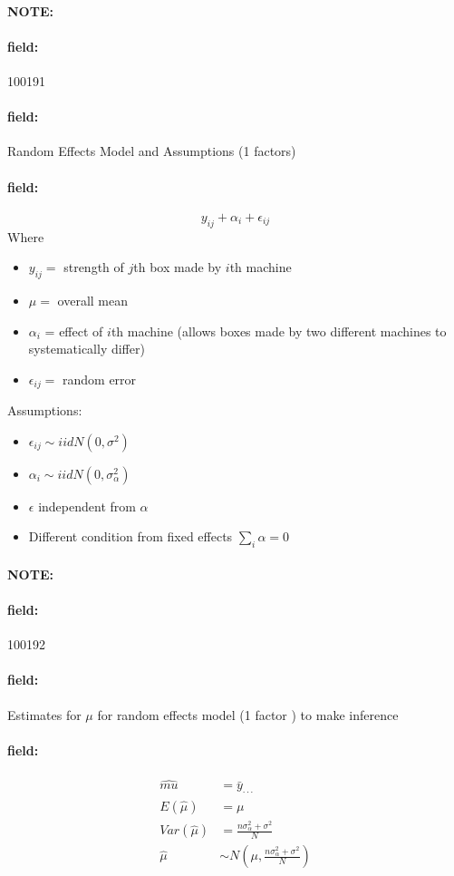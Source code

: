 \documentclass[12pt]{article}
\newenvironment{note}{\paragraph{NOTE:}}{}
\newenvironment{field}{\paragraph{field:}}{}
\begin{document}
\begin{note}
    \begin{field}
        \tiny 100191
    \end{field}
    \begin{field}
        Random Effects Model and Assumptions (1 factors)
    \end{field}
    \begin{field}
        $$y_{ij} + \alpha_i + \epsilon_{ij} $$
        Where
        \begin{itemize}
          \item $y_{ij} = $ strength of $j$th box made by $i$th machine
          \item $\mu = $ overall mean
          \item $\alpha_i$ = effect of $i$th machine (allows boxes made by two different machines to systematically differ)
          \item $\epsilon_{ij} = $ random error
        \end{itemize}

        Assumptions:
        \begin{itemize}
          \item $\epsilon_{ij} \sim iid N(0,\sigma^2)$
          \item $\alpha_i \sim iid N(0,\sigma_\alpha^2)$
          \item $\epsilon $ independent from $\alpha $
          \item Different condition from fixed effects $\sum_i \alpha = 0$
        \end{itemize}
    \end{field}
\end{note}

\begin{note}
    \begin{field}
        \tiny 100192
    \end{field}
    \begin{field}
        Estimates for $\mu$ for random effects model (1 factor ) to make inference
    \end{field}
    \begin{field}
        \begin{align*}
          \hat{mu} &= \bar{y}_{\cdot\cdot\cdot} \\
          E(\hat{\mu}) &= \mu \\
          Var(\hat{\mu}) &= \frac{n \sigma_\alpha^2 + \sigma^2}{N}\\
          \hat{\mu} &\sim N(\mu, \frac{n \sigma_\alpha^2 + \sigma^2}{N})
        \end{align*}
    \end{field}
\end{note}
\end{document}
